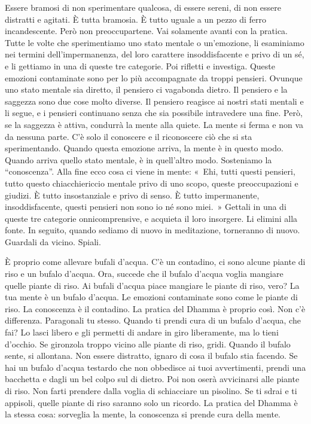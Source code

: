 Essere bramosi di non sperimentare qualcosa, di essere sereni, di non
essere distratti e agitati. È tutta bramosia. È tutto uguale a un pezzo
di ferro incandescente. Però non preoccupartene. Vai solamente avanti
con la pratica. Tutte le volte che sperimentiamo uno stato mentale o
un'emozione, li esaminiamo nei termini dell'impermanenza, del loro
carattere insoddisfacente e privo di un sé, e li gettiamo in una di
queste tre categorie. Poi rifletti e investiga. Queste emozioni
contaminate sono per lo più accompagnate da troppi pensieri. Ovunque uno
stato mentale sia diretto, il pensiero ci vagabonda dietro. Il pensiero
e la saggezza sono due cose molto diverse. Il pensiero reagisce ai
nostri stati mentali e li segue, e i pensieri continuano senza che sia
possibile intravedere una fine. Però, se la saggezza è attiva, condurrà
la mente alla quiete. La mente si ferma e non va da nessuna parte. C'è
solo il conoscere e il riconoscere ciò che si sta sperimentando. Quando
questa emozione arriva, la mente è in questo modo. Quando arriva quello
stato mentale, è in quell'altro modo. Sosteniamo la ``conoscenza''. Alla
fine ecco cosa ci viene in mente: «~Ehi, tutti questi pensieri, tutto
questo chiacchiericcio mentale privo di uno scopo, queste preoccupazioni
e giudizi. È tutto insostanziale e privo di senso. È tutto impermanente,
insoddisfacente, questi pensieri non sono io né sono miei.~» Gettali in
una di queste tre categorie onnicomprensive, e acquieta il loro
insorgere. Li elimini alla fonte. In seguito, quando sediamo di nuovo in
meditazione, torneranno di nuovo. Guardali da vicino. Spiali.

È proprio come allevare bufali d'acqua. C'è un contadino, ci sono alcune
piante di riso e un bufalo d'acqua. Ora, succede che il bufalo d'acqua
voglia mangiare quelle piante di riso. Ai bufali d'acqua piace mangiare
le piante di riso, vero? La tua mente è un bufalo d'acqua. Le emozioni
contaminate sono come le piante di riso. La conoscenza è il contadino.
La pratica del Dhamma è proprio così. Non c'è differenza. Paragonali tu
stesso. Quando ti prendi cura di un bufalo d'acqua, che fai? Lo lasci
libero e gli permetti di andare in giro liberamente, ma lo tieni
d'occhio. Se gironzola troppo vicino alle piante di riso, gridi. Quando
il bufalo sente, si allontana. Non essere distratto, ignaro di cosa il
bufalo stia facendo. Se hai un bufalo d'acqua testardo che non obbedisce
ai tuoi avvertimenti, prendi una bacchetta e dagli un bel colpo sul di
dietro. Poi non oserà avvicinarsi alle piante di riso. Non farti
prendere dalla voglia di schiacciare un pisolino. Se ti sdrai e ti
appisoli, quelle piante di riso saranno solo un ricordo. La pratica del
Dhamma è la stessa cosa: sorveglia la mente, la conoscenza si prende
cura della mente.

